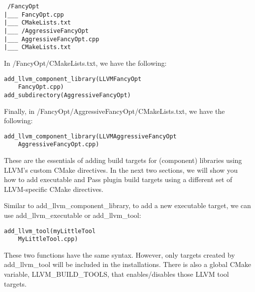 \begin{tcolorbox}[colback=white,colframe=black]
\tt
/FancyOpt \\
\hspace*{0.5cm}|\_\_\_ FancyOpt.cpp \\
\hspace*{0.5cm}|\_\_\_ CMakeLists.txt \\
\hspace*{0.5cm}|\_\_\_ /AggressiveFancyOpt \\
\hspace*{1cm}|\_\_\_ AggressiveFancyOpt.cpp \\
\hspace*{1cm}|\_\_\_ CMakeLists.txt
\end{tcolorbox}

In /FancyOpt/CMakeLists.txt, we have the following:

\begin{lstlisting}[style=styleCMake]
add_llvm_component_library(LLVMFancyOpt
	FancyOpt.cpp)
add_subdirectory(AggressiveFancyOpt)
\end{lstlisting}

Finally, in /FancyOpt/AggressiveFancyOpt/CMakeLists.txt, we have the following:

\begin{lstlisting}[style=styleCMake]
add_llvm_component_library(LLVMAggressiveFancyOpt
	AggressiveFancyOpt.cpp)
\end{lstlisting}

These are the essentials of adding build targets for (component) libraries using LLVM's custom CMake directives. In the next two sections, we will show you how to add executable and Pass plugin build targets using a different set of LLVM-specific CMake directives.


Similar to add\_llvm\_component\_library, to add a new executable target, we can use add\_llvm\_executable or add\_llvm\_tool:

\begin{lstlisting}[style=styleCMake]
add_llvm_tool(myLittleTool
	MyLittleTool.cpp)
\end{lstlisting}

These two functions have the same syntax. However, only targets created by add\_llvm\_tool will be included in the installations. There is also a global CMake variable, LLVM\_BUILD\_TOOLS, that enables/disables those LLVM tool targets.

